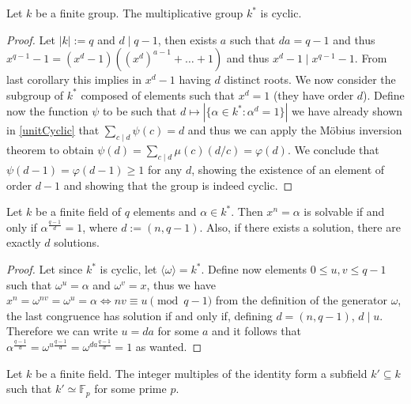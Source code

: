 \begin{theorem}
   Let \(k\) be a finite group. The multiplicative group \(k^\ast\) is cyclic.
\end{theorem}

\begin{proof}
   Let \(|k| := q\) and \(d \mid q-1\), then exists \(a\) such that \(da = q-1\)
   and thus \(x^{q-1} - 1 = (x^d - 1) ((x^d)^{a-1} + \dots + 1)\) and thus
   \(x^d - 1 \mid x^{q-1} - 1\). From last corollary this implies in \(x^d - 1\)
   having \(d\) distinct roots. We now consider the subgroup of \(k^\ast\)
   composed of elements such that \(x^d = 1\) (they have order \(d\)). Define
   now the function \(\psi\) to be such that \(d \mapsto |\{\alpha \in k^\ast :
   \alpha^d = 1\}|\) we have already shown in \ref{unitCyclic} that \(\sum_{c
   \mid d} \psi(c) = d\) and thus we can apply the Möbius inversion theorem to
   obtain  \(\psi(d) = \sum_{c\mid d} \mu(c) (d/c) = \varphi(d)\). We conclude
   that \(\psi(d-1) = \varphi(d-1) \geqslant 1\) for any \(d\), showing the
   existence of an element of order \(d-1\) and showing that the group is indeed
   cyclic.
\end{proof}

\begin{proposition}
   Let \(k\) be a finite field of \(q\) elements and \(\alpha \in k^\ast\). Then
   \(x^n = \alpha\) is solvable if and only if \(\alpha^{\frac{q-1}{d}} = 1\),
   where \(d := (n, q-1)\). Also, if there exists a solution, there are exactly
    \(d\) solutions.
\end{proposition}

\begin{proof}
   Let since \(k^\ast\) is cyclic, let \(\langle \omega \rangle = k^\ast\).
   Define now elements \(0 \leqslant u,v \leqslant q-1\) such that \(\omega^{u}
   = \alpha\) and \(\omega^{v} = x\), thus we have \(x^n = \omega^{nv} =
   \omega^u = \alpha \Leftrightarrow nv \equiv u \pmod{q-1}\) from the
   definition of the generator \(\omega\), the last congruence has solution if
   and only if, defining \(d = (n, q-1)\), \(d \mid u\). Therefore we can write
   \(u=da\) for some \(a\) and it follows that \(\alpha^{\frac{q-1}{d}} =
   \omega^{u \frac{q-1}{d}} = \omega^{da \frac{q-1}{d}} = 1\) as wanted. 
\end{proof}

\begin{proposition}
   Let \(k\) be a finite field. The integer multiples of the identity form a
   subfield \(k' \subseteq k\) such that \(k' \simeq \mathbb{F}_p\) for some
   prime \(p\).
\end{proposition}

